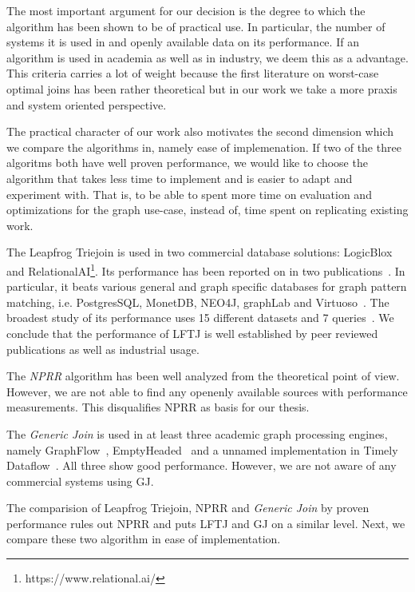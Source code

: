 The most important argument for our decision is the degree to which the algorithm has been shown
to be of practical use.
In particular, the number of systems it is used in and openly available data on its performance.
If an algorithm is used in academia as well as in industry, we deem this as a advantage.
This criteria carries a lot of weight because the first literature on worst-case optimal joins
has been rather theoretical but in our work we take a more praxis and system oriented perspective.

The practical character of our work also motivates the second dimension which we compare the algorithms in, namely
ease of implemenation.
If two of the three algoritms both have well proven performance, we would like to choose the algorithm
that takes less time to implement and is easier to adapt and experiment with.
That is, to be able to spent more time on evaluation and optimizations for the graph use-case, instead of,
time spent on replicating existing work.

The Leapfrog Triejoin is used in two commercial database solutions:
LogicBlox~\cite{logicBlox} and RelationalAI\footnote{https://www.relational.ai/}.
Its performance has been reported on in two publications~\cite{myria-detailed,olddog}.
In particular, it beats various general and graph specific databases for graph pattern matching, i.e.
PostgresSQL, MonetDB, NEO4J, graphLab and Virtuoso~\cite{olddog}.
The broadest study of its performance uses 15 different datasets and 7 queries~\cite{olddog}.
We conclude that the performance of \textsc{LFTJ} is well established by peer reviewed publications
as well as industrial usage.

The \textit{NPRR} algorithm has been well analyzed from the theoretical point of view.
However, we are not able to find any openenly available sources with performance measurements.
This disqualifies \textsc{NPRR} as basis for our thesis.

The \textit{Generic Join} is used in at least three academic graph processing engines,
namely GraphFlow~\cite{graphflow}, EmptyHeaded~\cite{emptyheaded} and a unnamed implementation in
Timely Dataflow~\cite{ammar2018distributed}.
All three show good performance.
However, we are not aware of any commercial systems using \textsc{GJ}.

The comparision of Leapfrog Triejoin, \textsc{NPRR} and \textit{Generic Join} by proven performance
rules out \textsc{NPRR} and puts \textsc{LFTJ} and \textsc{GJ} on a similar level.
Next, we compare these two algorithm in ease of implementation.

